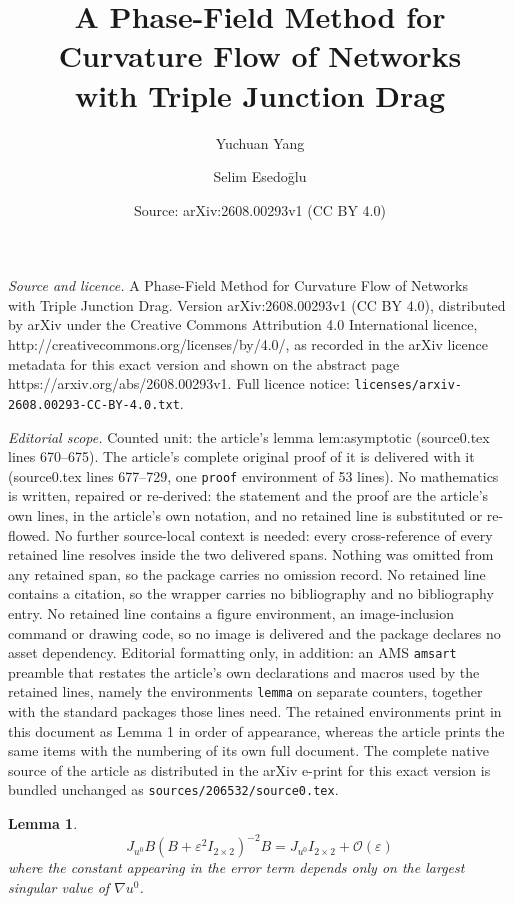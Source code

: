 \documentclass[10pt,a4paper]{amsart}
\title{A Phase-Field Method for Curvature Flow of Networks\\ with Triple Junction Drag}
\author{Yuchuan Yang \and Selim Esedo\={g}lu}
\date{Source: arXiv:2608.00293v1 (CC BY 4.0)}
\newtheorem{lemma}{Lemma}
\newcommand{\eps}{\varepsilon}
\begin{document}
\maketitle

\noindent\emph{Source and licence.} A Phase-Field Method for Curvature Flow of Networks\\ with Triple Junction Drag. Version arXiv:2608.00293v1 (CC BY 4.0), distributed by arXiv under the Creative Commons Attribution 4.0 International licence, http://creativecommons.org/licenses/by/4.0/, as recorded in the arXiv licence metadata for this exact version and shown on the abstract page https://arxiv.org/abs/2608.00293v1. Full licence notice: \texttt{licenses/arxiv-2608.00293-CC-BY-4.0.txt}.\par\smallskip

\noindent\textit{Editorial scope.} Counted unit: the article's lemma lem:asymptotic (source0.tex lines 670--675). The article's complete original proof of it is delivered with it (source0.tex lines 677--729, one \texttt{proof} environment of 53 lines). No mathematics is written, repaired or re-derived: the statement and the proof are the article's own lines, in the article's own notation, and no retained line is substituted or re-flowed.  No further source-local context is needed: every cross-reference of every retained line resolves inside the two delivered spans.  Nothing was omitted from any retained span, so the package carries no omission record.  No retained line contains a citation, so the wrapper carries no bibliography and no bibliography entry.  No retained line contains a figure environment, an image-inclusion command or drawing code, so no image is delivered and the package declares no asset dependency.  Editorial formatting only, in addition: an AMS \texttt{amsart} preamble that restates the article's own declarations and macros used by the retained lines, namely the environments \texttt{lemma} on separate counters, together with the standard packages those lines need.  The retained environments print in this document as Lemma 1 in order of appearance, whereas the article prints the same items with the numbering of its own full document.  The complete native source of the article as distributed in the arXiv e-print for this exact version is bundled unchanged as \texttt{sources/206532/source0.tex}.
\begin{lemma}\label{lem:asymptotic}
    \begin{equation}
        J_{u^0} B (B + \eps^2 I_{2\times 2})^{-2}B = J_{u^0}I_{2\times 2} + \mathcal{O}(\eps)
    \end{equation}
    where the constant appearing in the error term depends only on the largest singular value of $\nabla u^0$.
\end{lemma}
\end{document}

